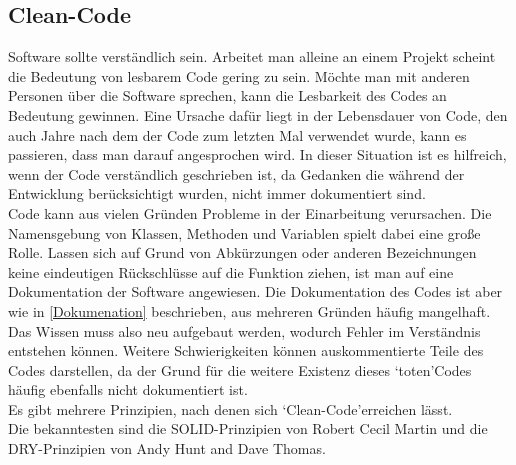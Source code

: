 \documentclass[12pt,a4paper]{article}
\begin{document}
\subsection{Clean-Code}
\label{CC}
Software sollte verständlich sein. Arbeitet man alleine an einem Projekt scheint die Bedeutung von lesbarem Code gering zu sein. Möchte man mit anderen Personen über die Software sprechen, kann die Lesbarkeit des Codes an Bedeutung gewinnen. Eine Ursache dafür liegt in der Lebensdauer von Code, den auch Jahre nach dem der Code zum letzten Mal verwendet wurde, kann es passieren, dass man darauf angesprochen wird. In dieser Situation ist es hilfreich, wenn der Code verständlich geschrieben ist, da Gedanken die während der Entwicklung berücksichtigt wurden, nicht immer dokumentiert sind\cite{https://doi.org/10.1111/2041-210X.13961}.\\
Code kann aus vielen Gründen Probleme in der Einarbeitung verursachen. Die Namensgebung von Klassen, Methoden und Variablen spielt dabei eine große Rolle. Lassen sich auf Grund von Abkürzungen oder anderen Bezeichnungen keine eindeutigen Rückschlüsse auf die Funktion ziehen, ist man auf eine Dokumentation der Software angewiesen. Die Dokumentation des Codes ist aber wie in \ref{Dokumenation} beschrieben, aus mehreren Gründen häufig mangelhaft. Das Wissen muss also neu aufgebaut werden, wodurch Fehler im Verständnis entstehen können. Weitere Schwierigkeiten können auskommentierte Teile des Codes darstellen, da der Grund für die weitere Existenz dieses \lq toten\rq\space Codes häufig ebenfalls nicht dokumentiert ist. \\
Es gibt mehrere Prinzipien, nach denen sich \lq Clean-Code\rq\space erreichen lässt.\\
Die bekanntesten sind die SOLID-Prinzipien von Robert Cecil Martin und die DRY-Prinzipien von Andy Hunt and Dave Thomas. \\
\end{document}

